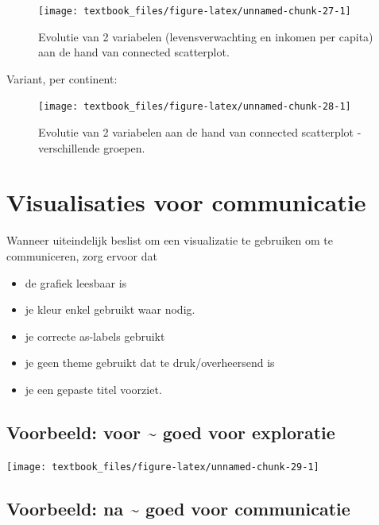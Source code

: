 \documentclass[]{tufte-book}
\providecommand{\tightlist}{%
  \setlength{\itemsep}{0pt}\setlength{\parskip}{0pt}}
\begin{document}
\begin{figure}
\texttt{[image: textbook\_files/figure-latex/unnamed-chunk-27-1]} \caption[Evolutie van 2 variabelen (levensverwachting en inkomen per capita) aan de hand van connected scatterplot]{Evolutie van 2 variabelen (levensverwachting en inkomen per capita) aan de hand van connected scatterplot.}\label{fig:unnamed-chunk-27}
\end{figure}

Variant, per continent:

\begin{figure}
\texttt{[image: textbook\_files/figure-latex/unnamed-chunk-28-1]} \caption[Evolutie van 2 variabelen aan de hand van connected scatterplot - verschillende groepen]{Evolutie van 2 variabelen aan de hand van connected scatterplot - verschillende groepen.}\label{fig:unnamed-chunk-28}
\end{figure}

\hypertarget{visualisaties-voor-communicatie}{%
\section{Visualisaties voor communicatie}\label{visualisaties-voor-communicatie}}

Wanneer uiteindelijk beslist om een visualizatie te gebruiken om te communiceren, zorg ervoor dat

\begin{itemize}
\tightlist
\item
  de grafiek leesbaar is
\item
  je kleur enkel gebruikt waar nodig.
\item
  je correcte as-labels gebruikt
\item
  je geen theme gebruikt dat te druk/overheersend is
\item
  je een gepaste titel voorziet.
\end{itemize}

\hypertarget{voorbeeld-voor-goed-voor-exploratie}{%
\subsection{Voorbeeld: voor \textasciitilde{} goed voor exploratie}\label{voorbeeld-voor-goed-voor-exploratie}}

\texttt{[image: textbook\_files/figure-latex/unnamed-chunk-29-1]}

\hypertarget{voorbeeld-na-goed-voor-communicatie}{%
\subsection{Voorbeeld: na \textasciitilde{} goed voor communicatie}\label{voorbeeld-na-goed-voor-communicatie}}
\end{document}
